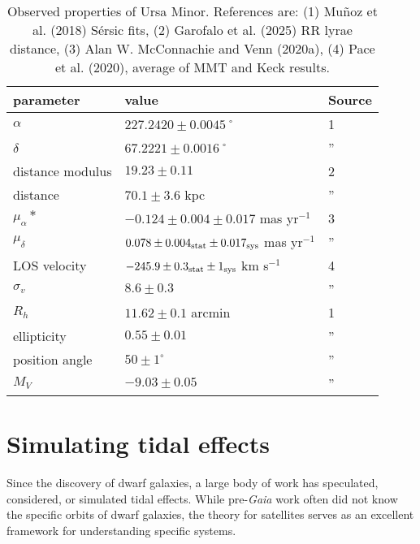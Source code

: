 \begin{table*}[t]
\centering
\caption[Observed Properties of Ursa Minor]{Observed properties of Ursa Minor. References are: (1) Muñoz et al. (2018) Sérsic fits, (2) Garofalo et al. (2025) RR lyrae distance, (3) Alan W. McConnachie and Venn (2020a), (4) Pace et al. (2020), average of MMT and Keck results. }
\label{tbl:umi_obs_props}
\begin{tabular}{lll}
\toprule
parameter & value & Source\\
\midrule
$\alpha$ & $ 227.2420 \pm 0.0045$˚ & 1\\
$\delta$ & $67.2221 \pm 0.0016$˚ & ”\\
distance modulus & $19.23 \pm 0.11$ & 2\\
distance & $70.1 \pm 3.6$ kpc & ”\\
$\mu_\alpha*$ & $-0.124 \pm 0.004 \pm 0.017$ mas yr$^{-1}$ & 3\\
$\mu_\delta$ & $0.078 \pm 0.004_{\rm stat} \pm 0.017_{\rm sys}$ mas yr$^{-1}$ & ”\\
LOS velocity & $-245.9 \pm 0.3_{\rm stat} \pm 1_{\rm sys}$ km s$^{-1}$ & 4\\
$\sigma_v$ & $8.6 \pm 0.3$ & ”\\
$R_h$ & $11.62 \pm 0.1$ arcmin & 1\\
ellipticity & $0.55 \pm 0.01$ & ”\\
position angle & $50 \pm 1^\circ$ & ”\\
$M_V$ & $-9.03 \pm 0.05$ & ”\\
\bottomrule
\end{tabular}
\end{table*}

\section{Simulating tidal effects}\label{simulating-tidal-effects}

Since the discovery of dwarf galaxies, a large body of work has
speculated, considered, or simulated tidal effects. While
pre-\emph{Gaia} work often did not know the specific orbits of dwarf
galaxies, the theory for satellites serves as an excellent framework for
understanding specific systems.

